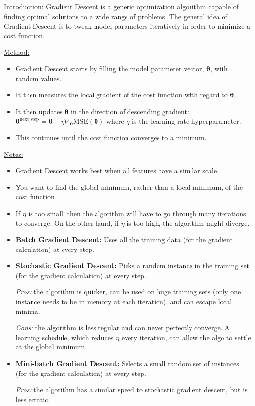 \underline{Introduction:}\newline
Gradient Descent is a generic optimization algorithm capable of finding optimal solutions to a wide range of problems. 
The general idea of Gradient Descent is to tweak model parameters iteratively in order to minimize a cost function.

\underline{Method:}
\vspace{-3.0mm}
\begin{itemize}
\item
Gradient Descent starts by filling the model parameter vector, $\boldsymbol{\theta}$, with random values.
\item
It then measures the local gradient of the cost function with regard to $\boldsymbol{\theta}$.
\item
It then updates $\boldsymbol{\theta}$ in the direction of descending gradient:
$\boldsymbol{\theta}^{\textrm{next step}} = \boldsymbol{\theta} - \eta \nabla_{\boldsymbol{\theta}} \textrm{MSE} (\boldsymbol{\theta})$
\newline
where $\eta$ is the learning rate hyperparameter.
\item
This continues until the cost function converges to a minimum.
\end{itemize}

\underline{Notes:}
\vspace{-3.0mm}
\begin{itemize}
\item
Gradient Descent works best when all features have a similar scale.
\item
You want to find the global minimum, rather than a local minimum, of the cost function
\item
If $\eta$ is too small, then the algorithm will have to go through many iterations to converge.\newline
On the other hand, if $\eta$ is too high, the algorithm might diverge.
\item
\textbf{Batch Gradient Descent:}\newline
Uses all the training data (for the gradient calculation) at every step.
\item
\textbf{Stochastic Gradient Descent:}\newline
Picks a random instance in the training set (for the gradient calculation) at every step.

\textit{Pros:} the algorithm is quicker, can be used on huge training sets (only one instance needs to be in memory at each iteration),
and can escape local minima.

\textit{Cons:} the algorithm is less regular and can never perfectly converge.
A learning schedule,
which reduces $\eta$ every iteration,
can allow the algo to settle at the global minimum.

\item
\textbf{Mini-batch Gradient Descent:}\newline
Selects a small random set of instances (for the gradient calculation) at every step.

\textit{Pros:} the algorithm has a similar speed to stochastic gradient descent, but is less erratic.
\end{itemize}

